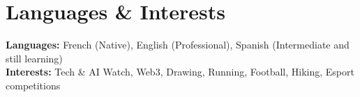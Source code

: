 \section{Languages \& Interests}
  \small{
    \textbf{Languages: } French (Native), English (Professional), Spanish (Intermediate and still learning) \\
    \textbf{Interests: } Tech \& AI Watch, Web3, Drawing, Running, Football, Hiking, Esport competitions
}
